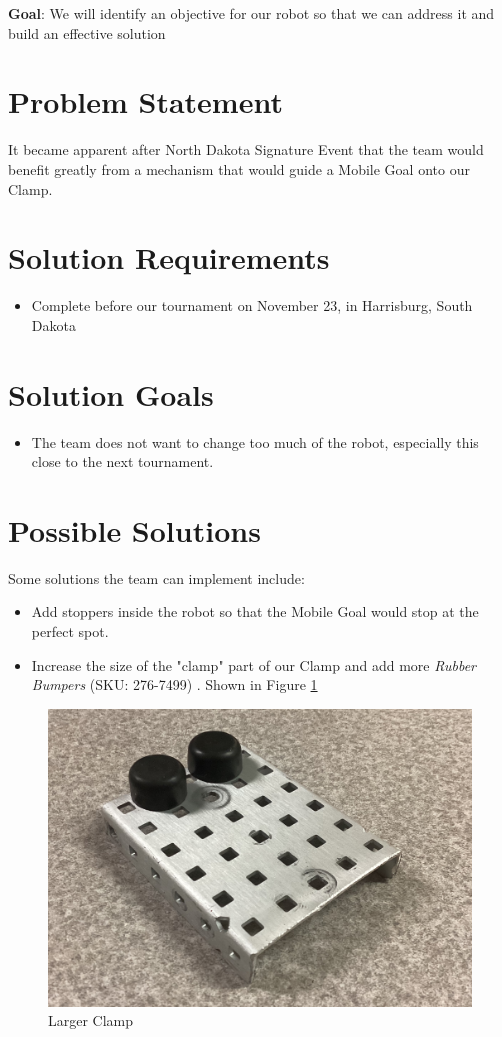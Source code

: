 \textbf{Goal}: We will identify an objective for our robot so that we can address it and build an effective solution
\section*{Problem Statement}
It became apparent after North Dakota Signature Event that the team would benefit greatly from a mechanism that would guide a Mobile Goal onto our Clamp.
\section*{Solution Requirements}
\begin{itemize}
    \item Complete before our tournament on November 23, in Harrisburg, South Dakota
\end{itemize}
\section*{Solution Goals}
\begin{itemize}
    \item The team does not want to change too much of the robot, especially this close to the next tournament.
\end{itemize}
\section*{Possible Solutions}
Some solutions the team can implement include:
\begin{itemize}
	\item Add stoppers inside the robot so that the Mobile Goal would stop at the perfect spot.
	\item Increase the size of the "clamp" part of our Clamp and add more \textit{Rubber Bumpers} (SKU: 276-7499) \vex. Shown in Figure \ref{fig:2stoppers}
\end{itemize}
\begin{figure}[H]
	\centering
	\includegraphics[width=0.5\linewidth]{images/Two Stopper.jpeg}
	\caption{Larger Clamp}
	\label{fig:2stoppers}
\end{figure}
